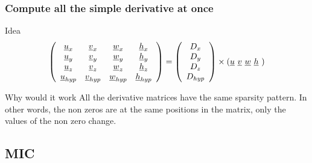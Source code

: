 \documentclass{beamer}
\begin{document}
\begin{frame}
  \frametitle{Compute all the simple derivative at once}

    \begin{block}{Idea}
      \scriptsize
      \begin{equation}
        \left( \begin{array}{cccc}
            \underline{u}_x     & \underline{v}_x     & \underline{w}_x     & \underline{h}_x \\
            \underline{u}_y     & \underline{v}_y     & \underline{w}_y     & \underline{h}_y \\
            \underline{u}_z     & \underline{v}_z     & \underline{w}_z     & \underline{h}_z \\
            \underline{u}_{hyp} & \underline{v}_{hyp} & \underline{w}_{hyp} & \underline{h}_{hyp}
          \end{array} \right)
        = \left(
          \begin{array}{c}
            D_{x}\\ D_{y}\\ D_{z}\\ D_{hyp}
          \end{array}\right)
        \times \left(\underline{u} \,\, \underline{v} \,\, \underline{w} \,\, \underline{h} \,\,\right) 
        \vspace{-1ex}
      \end{equation}
    \end{block}  
    
    \begin{block}{Why would it work}
      All the derivative matrices have the same sparsity pattern. In
      other words, the non zeros are at the same positions in the
      matrix, only the values of the non zero change.
    \end{block}

\end{frame}

\subsection{MIC}

  
\end{document}
